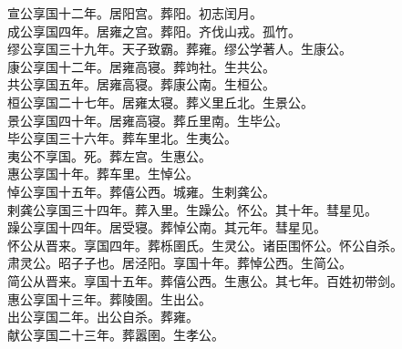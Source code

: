 \documentclass{zhvt-classic}
\begin{document}
\hspace*{2em}宣公享国十二年。居阳宫。葬阳。初志闰月。\\
\hspace*{2em}成公享国四年。居雍之宫。葬阳。齐伐山戎。孤竹。\\
\hspace*{2em}缪公享国三十九年。天子致霸。葬雍。缪公学著人。生康公。\\
\hspace*{2em}康公享国十二年。居雍高寝。葬竘社。生共公。\\
\hspace*{2em}共公享国五年。居雍高寝。葬康公南。生桓公。\\
\hspace*{2em}桓公享国二十七年。居雍太寝。葬义里丘北。生景公。\\
\hspace*{2em}景公享国四十年。居雍高寝。葬丘里南。生毕公。\\
\hspace*{2em}毕公享国三十六年。葬车里北。生夷公。\\
\hspace*{2em}夷公不享国。死。葬左宫。生惠公。\\
\hspace*{2em}惠公享国十年。葬车里。生悼公。\\
\hspace*{2em}悼公享国十五年。葬僖公西。城雍。生剌龚公。\\
\hspace*{2em}剌龚公享国三十四年。葬入里。生躁公。怀公。其十年。彗星见。\\
\hspace*{2em}躁公享国十四年。居受寝。葬悼公南。其元年。彗星见。\\
\hspace*{2em}怀公从晋来。享国四年。葬栎圉氏。生灵公。诸臣围怀公。怀公自杀。\\
\hspace*{2em}肃灵公。昭子子也。居泾阳。享国十年。葬悼公西。生简公。\\
\hspace*{2em}简公从晋来。享国十五年。葬僖公西。生惠公。其七年。百姓初带剑。\\
\hspace*{2em}惠公享国十三年。葬陵圉。生出公。\\
\hspace*{2em}出公享国二年。出公自杀。葬雍。\\
\hspace*{2em}献公享国二十三年。葬嚣圉。生孝公。\\
\end{document}
